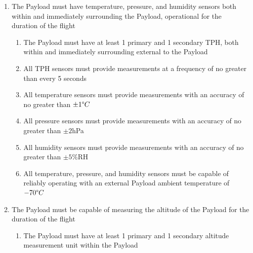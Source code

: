 \documentclass{article}
\begin{document}
\begin{enumerate}
        \begin{enumerate}
            \item The Payload bed must be capable of mounting an experimental payload with dimensions no greater than $100\times 100\times 100$mm
            \item The Payload must supply a regulated voltage rail to the experimental payload bed
                \begin{enumerate}
                    \item The specific voltage/capacity of each experimental bed power rail is dictated by the experiment itself
                    \item A particular experiment may not require an external power source, and in such a circumstance one will not have to provided by the Payload
                \end{enumerate}
        \end{enumerate}
    \item The Payload must have temperature, pressure, and humidity sensors both within and immediately surrounding the Payload, operational for the duration of the flight
        \begin{enumerate}
            \item The Payload must have at least 1 primary and 1 secondary TPH, both within and immediately surrounding external to the Payload
            \item All TPH sensors must provide measurements at a frequency of no greater than every 5 seconds
            \item All temperature sensors must provide measurements with an accuracy of no greater than $\pm 1\degree C$
            \item All pressure sensors must provide measurements with an accuracy of no greater than $\pm 2$hPa
            \item All humidity sensors must provide measurements with an accuracy of no greater than $\pm 5\%$RH
            \item All temperature, pressure, and humidity sensors must be capable of reliably operating with an external Payload ambient temperature of $-70\degree C$
        \end{enumerate}
    \item The Payload must be capable of measuring the altitude of the Payload for the duration of the flight
        \begin{enumerate}
            \item The Payload must have at least 1 primary and 1 secondary altitude measurement unit within the Payload

\end{enumerate}
\end{enumerate}
\end{document}
